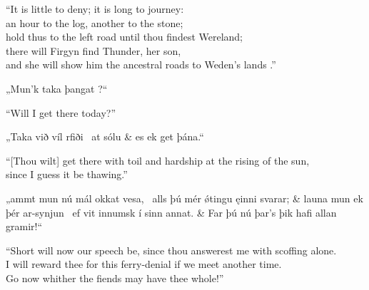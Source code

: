 \bvb%
“It is little to deny; it is long to journey: \\
an hour to the log, another to the stone;  \\
hold thus to the left road until thou findest Wereland;  \\
there will Firgyn find Thunder, her son, \\
and she will show him the ancestral roads to Weden’s lands .”\evb\evg


\bvg\bva{}%
„Mun’k taka þangat ?“\eva

\bvb%
“Will I get there today?”\evb\evg


\bvg\bva{}%
„Taka við víl  rfiði \hld\ at  sólu &
\ind es ek get þána.“\eva

\bvb%
“[Thou wilt] get there with toil and hardship at the rising of the sun, \\
\ind since I guess it be thawing.”\evb\evg


\bvg\bva{}%
„ammt mun nú mál okkat vesa, \hld\ alls þú mér ǿtingu ęinni svarar; &
launa mun ek þér ar-synjun \hld\ ef vit innumsk í sinn annat. &
Far þú nú þar’s þik hafi allan gramir!“\eva

\bvb%
“Short will now our speech be, since thou answerest me with scoffing alone. \\
I will reward thee for this ferry-denial if we meet another time. \\
Go now whither the fiends may have thee whole!”\evb\evg

\sectionline
